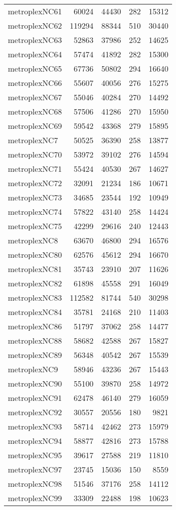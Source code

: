 \begin{tabular}{lrrrr}
metroplexNC61 & 60024 & 44430 & 282 & 15312 \\
metroplexNC62 & 119294 & 88344 & 510 & 30440 \\
metroplexNC63 & 52863 & 37986 & 252 & 14625 \\
metroplexNC64 & 57474 & 41892 & 282 & 15300 \\
metroplexNC65 & 67736 & 50802 & 294 & 16640 \\
metroplexNC66 & 55607 & 40056 & 276 & 15275 \\
metroplexNC67 & 55046 & 40284 & 270 & 14492 \\
metroplexNC68 & 57506 & 41286 & 270 & 15950 \\
metroplexNC69 & 59542 & 43368 & 279 & 15895 \\
metroplexNC7 & 50525 & 36390 & 258 & 13877 \\
metroplexNC70 & 53972 & 39102 & 276 & 14594 \\
metroplexNC71 & 55424 & 40530 & 267 & 14627 \\
metroplexNC72 & 32091 & 21234 & 186 & 10671 \\
metroplexNC73 & 34685 & 23544 & 192 & 10949 \\
metroplexNC74 & 57822 & 43140 & 258 & 14424 \\
metroplexNC75 & 42299 & 29616 & 240 & 12443 \\
metroplexNC8 & 63670 & 46800 & 294 & 16576 \\
metroplexNC80 & 62576 & 45612 & 294 & 16670 \\
metroplexNC81 & 35743 & 23910 & 207 & 11626 \\
metroplexNC82 & 61898 & 45558 & 291 & 16049 \\
metroplexNC83 & 112582 & 81744 & 540 & 30298 \\
metroplexNC84 & 35781 & 24168 & 210 & 11403 \\
metroplexNC86 & 51797 & 37062 & 258 & 14477 \\
metroplexNC88 & 58682 & 42588 & 267 & 15827 \\
metroplexNC89 & 56348 & 40542 & 267 & 15539 \\
metroplexNC9 & 58946 & 43236 & 267 & 15443 \\
metroplexNC90 & 55100 & 39870 & 258 & 14972 \\
metroplexNC91 & 62478 & 46140 & 279 & 16059 \\
metroplexNC92 & 30557 & 20556 & 180 & 9821 \\
metroplexNC93 & 58714 & 42462 & 273 & 15979 \\
metroplexNC94 & 58877 & 42816 & 273 & 15788 \\
metroplexNC95 & 39617 & 27588 & 219 & 11810 \\
metroplexNC97 & 23745 & 15036 & 150 & 8559 \\
metroplexNC98 & 51546 & 37176 & 258 & 14112 \\
metroplexNC99 & 33309 & 22488 & 198 & 10623 \\
\bottomrule
\end{tabular}
